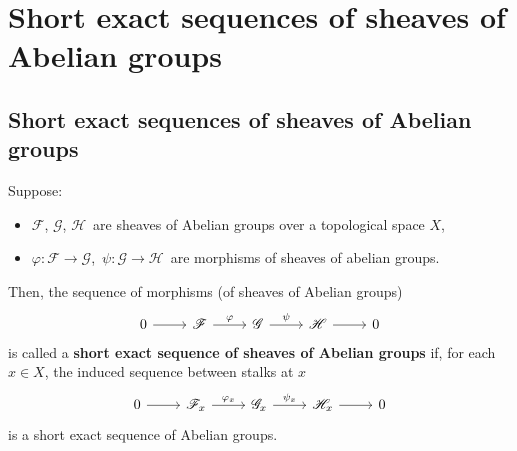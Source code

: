 

\vskip 0.5cm
\section{Short exact sequences of sheaves of Abelian groups}


\renewcommand{\theenumi}{\roman{enumi}}
\renewcommand{\labelenumi}{\textnormal{(\theenumi)}$\;\;$}


\subsection{Short exact sequences of sheaves of Abelian groups}
\setcounter{theorem}{0}
\setcounter{equation}{0}

\begin{definition}
\mbox{}\vskip 0.1cm
\noindent
Suppose:
\begin{itemize}
\item
	$\mathscr{F}$, $\mathscr{G}$, $\mathscr{H}$\, are sheaves of Abelian groups over a topological space $X$,
\item
	$\varphi : \mathscr{F}\longrightarrow\mathscr{G}$,\,
	$\psi : \mathscr{G}\longrightarrow\mathscr{H}$\,
	are morphisms of sheaves of abelian groups.
\end{itemize}
Then, the sequence of morphisms (of sheaves of Abelian groups)
\begin{equation*}
\begin{tikzcd}
0                 \arrow[r] &
\mathscr{F} \arrow[r, "\varphi"] &
\mathscr{G} \arrow[r, "\psi"] &
\mathscr{H} \arrow[r] &
0
\end{tikzcd}
\end{equation*}
is called a \textbf{short exact sequence of sheaves of Abelian groups}
if, for each $x \in X$, the induced sequence between stalks at $x$
\begin{equation*}
\begin{tikzcd}
0                 \arrow[r] &
\mathscr{F}_{x} \arrow[r, "\varphi_{x}"] &
\mathscr{G}_{x} \arrow[r, "\psi_{x}"] &
\mathscr{H}_{x} \arrow[r] &
0
\end{tikzcd}
\end{equation*}
is a short exact sequence of Abelian groups.
\end{definition}

